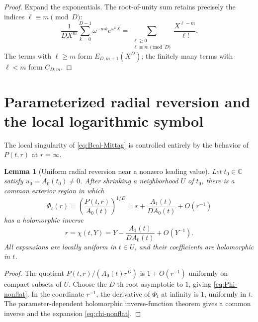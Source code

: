 \documentclass[11pt]{article}
\numberwithin{equation}{section}
\newtheorem{lemma}[lemma]{Lemma}
\theoremstyle{definition}
\theoremstyle{remark}
\newcommand{\C}{\mathbb C}
\begin{document}
\begin{proof}
Expand the exponentials.  The root-of-unity sum retains precisely the indices $\ell\equiv m\pmod D$:
\[
  \frac1{DX^m}\sum_{k=0}^{D-1}\omega^{-mk}e^{\omega^kX}
  =\sum_{\substack{\ell\ge0\\\ell\equiv m\pmod D}}
   \frac{X^{\ell-m}}{\ell!}.
\]
The terms with $\ell\ge m$ form $E_{D,m+1}(X^D)$; the finitely many terms with $\ell<m$ form $C_{D,m}$.
\end{proof}

\section{Parameterized radial reversion and the local logarithmic symbol}\label{sec:symbol}

The local singularity of \eqref{eq:Bcal-Mittag} is controlled entirely by the behavior of $P(t,r)$ at $r=\infty$.

\begin{lemma}[Uniform radial reversion near a nonzero leading value]\label{lem:uniform-nonflat-reversion}
Let $t_0\in\C$ satisfy $u_0=A_0(t_0)\neq0$.  After shrinking a neighborhood $U$ of $t_0$, there is a common exterior region in which
\begin{equation}\label{eq:Phi-nonflat}
  \Phi_t(r)=\left(\frac{P(t,r)}{A_0(t)}\right)^{1/D}
  =r+\frac{A_1(t)}{DA_0(t)}+O(r^{-1})
\end{equation}
has a holomorphic inverse
\begin{equation}\label{eq:chi-nonflat}
  r=\chi(t,Y)
  =Y-\frac{A_1(t)}{DA_0(t)}+O(Y^{-1}).
\end{equation}
All expansions are locally uniform in $t\in U$, and their coefficients are holomorphic in $t$.
\end{lemma}

\begin{proof}
The quotient $P(t,r)/(A_0(t)r^D)$ is $1+O(r^{-1})$ uniformly on compact subsets of $U$.  Choose the $D$-th root asymptotic to $1$, giving \eqref{eq:Phi-nonflat}.  In the coordinate $r^{-1}$, the derivative of $\Phi_t$ at infinity is $1$, uniformly in $t$.  The parameter-dependent holomorphic inverse-function theorem gives a common inverse and the expansion \eqref{eq:chi-nonflat}.
\end{proof}
\end{document}
